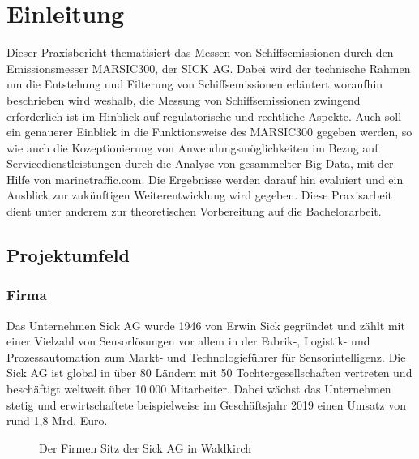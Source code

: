 
\chapter{Einleitung}
Dieser Praxisbericht thematisiert das Messen von Schiffsemissionen durch den Emissionsmesser MARSIC300, der SICK AG. Dabei wird der technische Rahmen um die Entstehung und Filterung von Schiffsemissionen erläutert woraufhin beschrieben wird weshalb, die Messung von Schiffsemissionen zwingend erforderlich ist im Hinblick auf regulatorische und rechtliche Aspekte. Auch soll ein genauerer Einblick in die Funktionsweise des MARSIC300 gegeben werden, so wie auch die Kozeptionierung von Anwendungsmöglichkeiten im Bezug auf Servicedienstleistungen durch die Analyse von gesammelter Big Data, mit der Hilfe von marinetraffic.com. Die Ergebnisse werden darauf hin evaluiert und ein Ausblick zur zukünftigen Weiterentwicklung wird gegeben. Diese Praxisarbeit dient unter anderem zur theoretischen Vorbereitung auf die Bachelorarbeit. 

\section{Projektumfeld}


\subsection{Firma}
Das Unternehmen Sick AG wurde 1946 von Erwin Sick gegründet und zählt mit einer Vielzahl von Sensorlösungen vor allem in der Fabrik-, Logistik- und Prozessautomation zum Markt- und Technologieführer für Sensorintelligenz. Die Sick AG ist global in über 80 Ländern mit 50 Tochtergesellschaften vertreten und beschäftigt weltweit über 10.000 Mitarbeiter. Dabei wächst das Unternehmen stetig und erwirtschaftete beispielweise im Geschäftsjahr 2019 einen Umsatz von rund 1,8 Mrd. Euro\cite{SICK.2021a}.
\begin{figure}[H]
\centering
{}
\caption{\label{fig-firmenHQ}Der Firmen Sitz der Sick AG in Waldkirch}
\end{figure}
